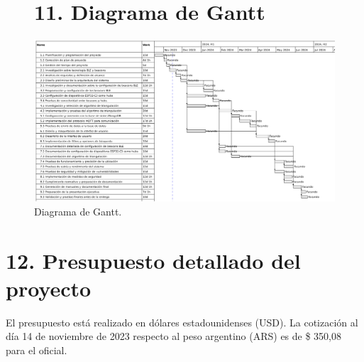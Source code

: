 \documentclass[
11pt, %
]{charter}
\begin{document}
\pagebreak

\begin{landscape}
\begin{figure}[htpb]
\section{11. Diagrama de Gantt}
\centering 
\includegraphics[height=.8\textheight]{./Figuras/Gantt.pdf}
\caption{Diagrama de Gantt.}
\label{fig:diagGantt}
\end{figure}

\end{landscape}

\newpage
\section{12. Presupuesto detallado del proyecto}
\label{sec:presupuesto}

El presupuesto está realizado en dólares estadounidenses (USD). La cotización al día 14 de noviembre de 2023 respecto al peso argentino (ARS) es de {\$ 350,08} para el  oficial.
\end{document}
